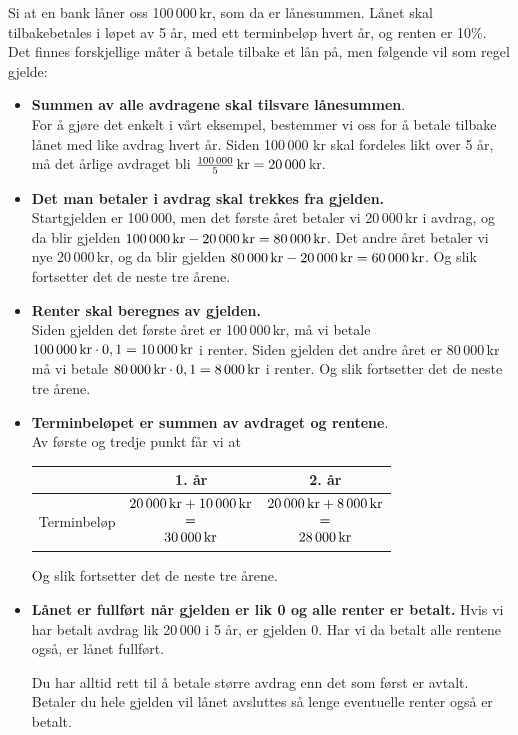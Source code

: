 Si at en bank låner  oss 100\,000\,kr, som da er lånesummen. Lånet skal tilbakebetales i løpet av 5 år, med ett terminbeløp hvert år, og renten er 10\%. Det finnes forskjellige måter å betale tilbake et lån på, men følgende vil som regel gjelde:
\begin{itemize}
	\item \textbf{Summen av alle avdragene skal tilsvare lånesummen}.\\
	 For å gjøre det enkelt i vårt eksempel, bestemmer vi oss for å betale tilbake lånet med like avdrag hvert år. Siden 100\,000 kr skal fordeles likt over 5 år, må det årlige avdraget bli $ \frac{100\,000}{5}\,\text{kr}=20\,000 $\,kr.
	\item \textbf{Det man betaler i avdrag skal trekkes fra gjelden.}\\
	
	Startgjelden er 100\,000, men det første året betaler vi 20\,000\,kr i avdrag, og da blir gjelden $100\,000\,\text{kr}-20\,000\,\text{kr} =80\,000\,\text{kr} $. Det andre året betaler vi nye 20\,000\,kr, og da blir gjelden $ 80\,000\,\text{kr}-20\,000\,\text{kr} =60\,000\,\text{kr}  $. Og slik fortsetter det de neste tre årene.
	\item \textbf{Renter skal beregnes av gjelden.}\\
	Siden gjelden det første året er 100\,000\,kr, må vi betale \\${ 100\,000\,\text{kr}\cdot0,1=10\,000\,\text{kr} } $ i renter. Siden gjelden det andre året er 80\,000\,kr må vi betale ${ 80\,000\,\text{kr}\cdot0,1=8\,000\,\text{kr} } $ i renter.  Og slik fortsetter det de neste tre årene.
	
	\item \textbf{Terminbeløpet er summen av avdraget og rentene}.\\
	
	Av første og tredje punkt får vi at\os
	\centering
	\begin{tabular}{c| c |c}
		 & 1. år & 2. år \\ \hline
		Terminbeløp 
			& $\begin{matrix}
			20\,000\,\text{kr} +10\,000\,\text{kr}\\
			= \\
			30\,000\,\text{kr}
			\end{matrix} $  
				& $\begin{matrix}
					20\,000\,\text{kr} +8\,000\,\text{kr}\\
					= \\
					28\,000\,\text{kr}
					\end{matrix} $ 
	\end{tabular}\os
\raggedright 
Og slik fortsetter det de neste tre årene.
\item \textbf{Lånet er fullført når gjelden er lik 0 og alle renter er betalt.}\os
Hvis vi har betalt avdrag lik 20\,000 i 5 år, er gjelden 0. Har vi da betalt alle rentene også, er lånet fullført. \os

{\footnotesize\mer Du har alltid rett til å betale større avdrag enn det som først er avtalt. Betaler du hele gjelden vil lånet avsluttes så lenge eventuelle renter også er betalt.}
\end{itemize}\vsk
